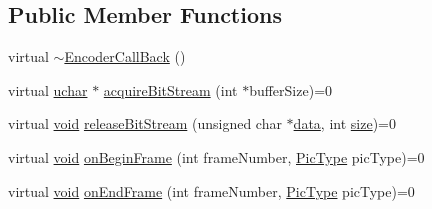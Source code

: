 \subsection*{Public Member Functions}
\begin{DoxyCompactItemize}
\item 
virtual \hyperlink{classcv_1_1gpu_1_1VideoWriter__GPU_1_1EncoderCallBack_a97bcc1078b3fd45fe71cacaf1b0fb84c}{$\sim$\-Encoder\-Call\-Back} ()
\item 
virtual \hyperlink{core_2types__c_8h_a65f85814a8290f9797005d3b28e7e5fc}{uchar} $\ast$ \hyperlink{classcv_1_1gpu_1_1VideoWriter__GPU_1_1EncoderCallBack_a6ed27569690142b968dc2c0c594d5c26}{acquire\-Bit\-Stream} (int $\ast$buffer\-Size)=0
\item 
virtual \hyperlink{legacy_8hpp_a8bb47f092d473522721002c86c13b94e}{void} \hyperlink{classcv_1_1gpu_1_1VideoWriter__GPU_1_1EncoderCallBack_a60b69466cc4228ec4396a9ac3c65c73e}{release\-Bit\-Stream} (unsigned char $\ast$\hyperlink{legacy_8hpp_ab9fe6c09e6d02865a953fffc12fe6ca0}{data}, int \hyperlink{legacy_8hpp_ae97003f8d5c64cdfb99f6f2606d121b6}{size})=0
\item 
virtual \hyperlink{legacy_8hpp_a8bb47f092d473522721002c86c13b94e}{void} \hyperlink{classcv_1_1gpu_1_1VideoWriter__GPU_1_1EncoderCallBack_ae4e7ca1b509fb4277deecdb6b3d3ceef}{on\-Begin\-Frame} (int frame\-Number, \hyperlink{classcv_1_1gpu_1_1VideoWriter__GPU_1_1EncoderCallBack_aa8c69464d7b00114cd7b058a2738be0e}{Pic\-Type} pic\-Type)=0
\item 
virtual \hyperlink{legacy_8hpp_a8bb47f092d473522721002c86c13b94e}{void} \hyperlink{classcv_1_1gpu_1_1VideoWriter__GPU_1_1EncoderCallBack_a74d338c940bb0dd5070fbc622a6392b3}{on\-End\-Frame} (int frame\-Number, \hyperlink{classcv_1_1gpu_1_1VideoWriter__GPU_1_1EncoderCallBack_aa8c69464d7b00114cd7b058a2738be0e}{Pic\-Type} pic\-Type)=0
\end{DoxyCompactItemize}


